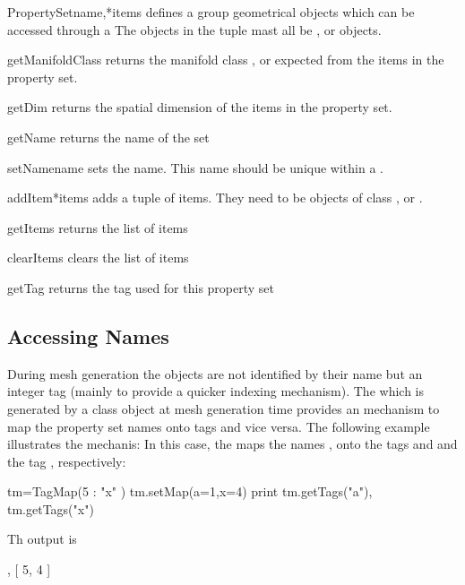 \begin{classdesc}{PropertySet}{name,*items}
defines a group geometrical objects which can be accessed through a 
The objects in the tuple  mast all be \ManifoldOneD, \ManifoldTwoD or \ManifoldThreeD objects.
\end{classdesc}


\begin{methoddesc}[PropertySet]{getManifoldClass}{}
returns the manifold class \ManifoldOneD, \ManifoldTwoD or \ManifoldThreeD expected from the items
in the property set.
\end{methoddesc}

\begin{methoddesc}[PropertySet]{getDim}{}
returns the spatial dimension of the items
in the property set. 
\end{methoddesc}

\begin{methoddesc}[PropertySet]{getName}{}
returns the name of the set
\end{methoddesc}

\begin{methoddesc}[PropertySet]{setName}{name}
sets the name. This name should be unique within a \Design.
\end{methoddesc}

\begin{methoddesc}[PropertySet]{addItem}{*items}
adds a tuple of items. They need to be objects of class \ManifoldOneD, \ManifoldTwoD or \ManifoldThreeD. 
\end{methoddesc}

\begin{methoddesc}[PropertySet]{getItems}{}
returns the list of items
\end{methoddesc}

\begin{methoddesc}[PropertySet]{clearItems}{}
clears the list of items 
\end{methoddesc}

\begin{methoddesc}[PropertySet]{getTag}{}
returns the tag used for this property set
\end{methoddesc}

\subsection{Accessing \PropertySet Names}
During mesh generation the \PropertySet objects are not identified by their name but an integer tag (mainly to provide 
a quicker indexing mechanism). The \TagMap which is generated by a \Design class object at mesh generation time
provides an mechanism to map the property set names onto tags and vice versa. 
The following example illustrates the mechanis: In this case, the \TagMap {} 
maps the names ,  onto the tags  and  and the tag , respectively:   
\begin{python}
tm=TagMap({5 : "x" })
tm.setMap(a=1,x=4)
print tm.getTags("a"), tm.getTags("x") 
\end{python}
Th output is 
\begin{python}
   [ 1 ], [ 5, 4 ]
\end{python}

